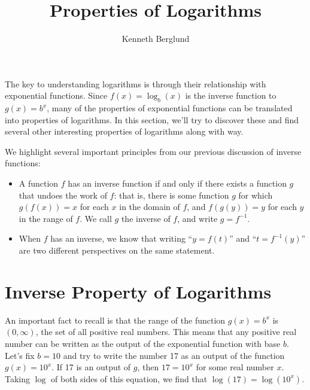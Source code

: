 \documentclass[nooutcomes]{ximera}
\author{Kenneth Berglund}
\title{Properties of Logarithms}
\begin{document}
\begin{abstract}
  
\end{abstract}
\maketitle




The key to understanding logarithms is through their relationship with exponential functions. Since $f(x) = \log_b(x)$ is the inverse function to $g(x) = b^x$, many of the properties of exponential functions can be translated into properties of logarithms. In this section, we'll try to discover these and find several other interesting properties of logarithms along with way.

We highlight several important principles from our previous discussion of inverse functions:
\begin{itemize}
\item
A function $f$ has an inverse function if and only if there exists a function $g$ that undoes the work of $f$: that is, there is some function $g$ for which $g(f(x)) = x$ for each $x$ in the domain of $f$, and $f(g(y)) = y$ for each $y$ in the range of $f$. We call $g$ the inverse of $f$, and write $g = f^{-1}$.%
\item
When $f$ has an inverse, we know that writing ``$y = f(t)$'' and ``$t = f^{-1}(y)$''  are two different perspectives on the same statement.
\end{itemize}
%


\section{Inverse Property of Logarithms}

An important fact to recall is that the range of the function $g(x) = b^x$ is $(0, \infty)$, the set of all positive real numbers. This means that any positive real number can be written as the output of the exponential function with base $b$. Let's fix $b = 10$ and try to write the number 17 as an output of the function $g(x) = 10^x$. If 17 is an output of $g$, then $17 = 10^x$ for some real number $x$. Taking $\log$ of both sides of this equation, we find that $\log(17) = \log(10^x)$. 
\end{document}

